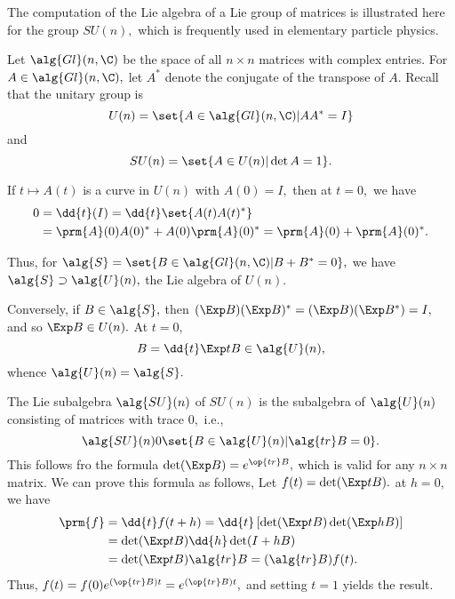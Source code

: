 \begin{exmp}
The computation of the Lie algebra of a Lie group of matrices is illustrated here for the group $SU(n),$ which is
frequently used in elementary particle physics.

Let $\alg{Gl}(n, \C)$ be the space of all $n \times n$ matrices with complex entries. For $A \in \alg{Gl}(n, \C),$ let
$A^{*}$ denote the conjugate of the transpose of $A.$ Recall that the unitary group is $$U(n)=\set{A \in \alg{Gl}(n,
\C)| A A^{*}=I}$$ and $$SU(n)=\set{A \in U(n)| \det A =1}.$$

If $t \mapsto A(t)$ is a curve in $U(n)$ with $A(0)=I,$ then at $t=0,$ we have
\begin{align*}
 0&=\dd{t}(I)=\dd{t}\set{A(t)A(t)^{*}} \\
&= \prm{A}(0)A(0)^{*}+ A(0)\prm{A}(0)^{*}=\prm{A}(0)+\prm{A}(0)^{*}.
\end{align*}

Thus, for $\alg{S}=\set{B \in \alg{Gl}(n, \C)| B + B^{*}=0},$ we have $\alg{S} \supset \alg{U}(n),$ the Lie algebra of
$U(n).$

Conversely, if $B \in \alg{S},$ then $(\Exp B)(\Exp B)^{*}=(\Exp B)(\Exp B^{*})=I,$ and so $\Exp B \in U(n).$ At $t=0,$
$$
B=\dd{t}\Exp tB \in \alg{U}(n),
$$
whence $\alg{U}(n)= \alg{S}.$

The Lie subalgebra $\alg{SU}(n)$ of $SU(n)$ is the subalgebra of $\alg{U}(n)$ consisting of matrices with trace $0,$
i.e., $$
\alg{SU}(n)0\set{B \in \alg{U}(n)| \alg{tr} B=0}.
$$
This follows fro the formula $\det (\Exp B)=e^{\op{tr}B},$ which is valid for any $n \times n$ matrix. We can prove
this formula as follows, Let $f(t)=\det (\Exp tB). $ at $h=0,$ we have
\begin{align*}
 \prm{f}&=\dd{t}f(t+h)=\dd{t}\left[\det (\Exp tB) \det(\Exp hB)\right] \\
&=\det(\Exp tB)\dd{h}\det(I+hB)\\
&=\det(\Exp tB)\alg{tr} B =(\alg{tr}B)f(t).
\end{align*}
Thus, $f(t)=f(0)e^{(\op{tr}B)t}=e^{(\op{tr}B)t},$ and setting $t=1$ yields the result.

 
\end{exmp}








